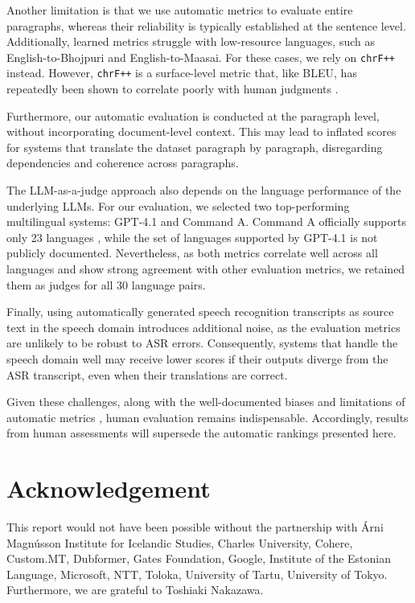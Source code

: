 \documentclass[11pt]{article}
\begin{document}
Another limitation is that we use automatic metrics to evaluate entire paragraphs, whereas their reliability is typically established at the sentence level. Additionally, learned metrics struggle with low-resource languages, such as English-to-Bhojpuri and English-to-Maasai. For these cases, we rely on \texttt{chrF++} instead. However, \texttt{chrF++} is a surface-level metric that, like BLEU, has repeatedly been shown to correlate poorly with human judgments \citep{kocmi-etal-2021-ship, freitag-etal-2022-results, freitag-etal-2023-results}.

Furthermore, our automatic evaluation is conducted at the paragraph level, without incorporating document-level context. This may lead to inflated scores for systems that translate the dataset paragraph by paragraph, disregarding dependencies and coherence across paragraphs.

The LLM-as-a-judge approach also depends on the language performance of the underlying LLMs. For our evaluation, we selected two top-performing multilingual systems: GPT-4.1 and Command A. Command A officially supports only 23 languages \citep{cohere2025commandaenterprisereadylarge}, while the set of languages supported by GPT-4.1 is not publicly documented. Nevertheless, as both metrics correlate well across all languages and show strong agreement with other evaluation metrics, we retained them as judges for all 30 language pairs.

Finally, using automatically generated speech recognition transcripts as source text in the speech domain introduces additional noise, as the evaluation metrics are unlikely to be robust to ASR errors. Consequently, systems that handle the speech domain well may receive lower scores if their outputs diverge from the ASR transcript, even when their translations are correct.

Given these challenges, along with the well-documented biases and limitations of automatic metrics \citep{karpinska-etal-2022-demetr, moghe2024machine}, human evaluation remains indispensable. Accordingly, results from human assessments will supersede the automatic rankings presented here.


\section*{Acknowledgement}
This report would not have been possible without the partnership with Árni Magnússon Institute for Icelandic Studies, Charles University, Cohere, Custom.MT, Dubformer, Gates Foundation, Google, Institute of the Estonian Language, Microsoft, NTT, Toloka, University of Tartu, University of Tokyo.
Furthermore, we are grateful to Toshiaki Nakazawa.
\end{document}
